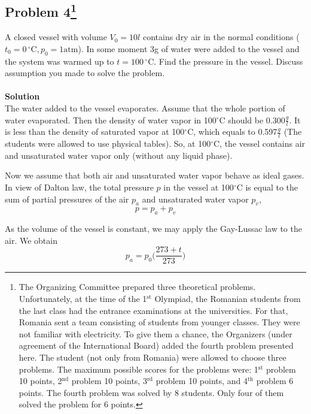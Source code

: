 \documentclass[12pt,a4paper]{book}
\begin{document}
	\subsection*{Problem 4\footnote{The Organizing Committee prepared three theoretical problems. Unfortunately, at the time of the 1$^\text{st}$ Olympiad, the Romanian students from the last class had the entrance examinations at the universities. For that, Romania sent a team consisting of students from younger classes. They were not familiar with electricity. To give them a chance, the Organizers (under agreement of the International Board) added the fourth problem presented here. The student (not only from Romania) were allowed to choose three problems. The maximum possible scores for the problems were: 1$^\text{st}$ problem 10 points, 2$^\text{nd}$ problem 10 points, 3$^\text{rd}$ problem 10 points, and 4$^\text{th}$ problem 6 points. The fourth problem was solved by 8 students. Only four of them solved the problem for 6 points.}}
	A closed vessel with volume $V_0=10l$ contains dry air in the normal conditions ($t_0=0\,^{\circ}\mathrm{C},p_0=1\text{atm}$). In some moment 3g of water were added to the vessel and the system was warmed up to $t=100\,^{\circ}\mathrm{C}$. Find the pressure in the vessel. Discuss assumption you made to solve the problem.\\ \\
	\textbf{Solution}\\
	The water added to the vessel evaporates. Assume that the whole portion of water evaporated. Then the density of water vapor in 100$^{\circ}\mathrm{C}$ should be 0.300$\frac{g}{l}$. It is less than the density of saturated vapor at 100$^{\circ}\mathrm{C}$, which equals to 0.597$\frac{g}{l}$ (The students were allowed to use physical tables). So, at 100$^{\circ}\mathrm{C}$, the vessel contains air and unsaturated water vapor only (without any liquid phase).\par
	Now we assume that both air and unsaturated water vapor behave as ideal gases. In view of Dalton law, the total pressure $p$ in the vessel at 100$^{\circ}\mathrm{C}$ is equal to the sum of partial pressures of the air $p_a$ and unsaturated water vapor $p_v$,
	\begin{equation*}
		p=p_a+p_v
	\end{equation*}\par
	As the volume of the vessel is constant, we may apply the Gay-Lussac law to the air. We obtain
	\begin{equation*}
		p_a=p_0\Big(\frac{273+t}{273}\Big)
	\end{equation*}\par
\end{document}
